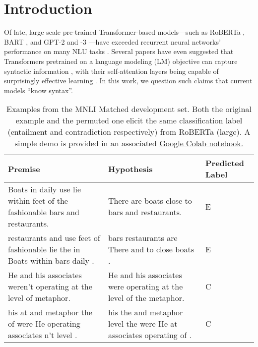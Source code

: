 \documentclass[11pt,a4paper]{article}
\begin{document}
\section{Introduction}

Of late, large scale pre-trained Transformer-based \citep{vaswani-etal-2017-attention} models---such as RoBERTa \citep{liu-et-al-2019-roberta}, BART \citep{lewis-etal-2020-bart}, and GPT-2 and -3 \citep{radford-etal-2019-language,brown-etal-2020-gpt3}---have exceeded recurrent neural networks' performance on many NLU tasks \citep{wang-etal-2018-glue, wang-etal-2019-superglue}. %
Several papers have even suggested that Transformers pretrained on a language modeling (LM) objective can capture syntactic information \citep{hewitt-manning-2019-structural,jawahar-etal-2019-bert, warstadt-bowman-2020-can, wu-etal-2020-perturbed}, with their self-attention layers being capable of surprisingly effective learning \cite{rogers2020}. In this work, we question such claims that current models ``know syntax''. 

\begin{table}[t]
    \centering
    \small
    \begin{adjustbox}{max width=0.95\linewidth}
    \begin{tabular}{p{11em}p{9em}p{3em}} %
    \toprule
     \bf Premise & \bf Hypothesis & \bf Predicted Label \\ \midrule
    Boats in daily use lie within feet of the fashionable bars and restaurants.  & There are boats close to bars and restaurants. & E \\ 
    \addlinespace[0.5em]
    restaurants and use feet of fashionable lie the in Boats within bars daily . & bars restaurants are There and to close boats . & E \\ \midrule
    He and his associates weren't operating at the level of metaphor. & He and his associates were operating at the level of the metaphor. & C\\  \addlinespace[0.5em]
    his at and metaphor the of were He operating associates n't level . & his the and metaphor level the were He at associates operating of . & C\\ 
    \bottomrule
    \end{tabular}
   \end{adjustbox}
    \caption{Examples from the MNLI Matched development set. Both the original example and the permuted one elicit the same classification label (entailment and contradiction respectively) from RoBERTa (large). 
    A simple demo is provided in an associated \href{https://colab.research.google.com/drive/1vv8Xmag1go3dib4vZXUZXAFB4ltDaMH7?usp=sharing}{Google Colab notebook.}}
    \label{tab:example}
\end{table}
\end{document}
